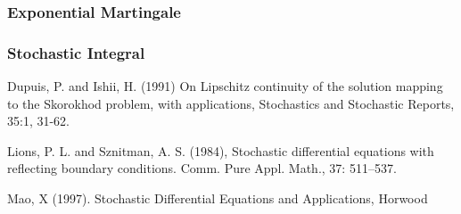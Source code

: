 \documentclass[]{article}
\theoremstyle{definition}
\theoremstyle{assumption}
\theoremstyle{remark}
\begin{document}
\subsubsection{Exponential Martingale}

\subsubsection{Stochastic Integral}

\begin{thebibliography}{9}

Dupuis, P. and Ishii, H. (1991) On Lipschitz continuity of the solution
mapping to the Skorokhod problem, with applications, Stochastics and Stochastic Reports,
35:1, 31-62.

 Lions, P. L. and Sznitman, A. S. (1984), Stochastic differential equations with reflecting boundary conditions. Comm. Pure Appl. Math., 37: 511–537.

Mao, X (1997). Stochastic Differential Equations and Applications, Horwood

\end{thebibliography}
\end{document}
